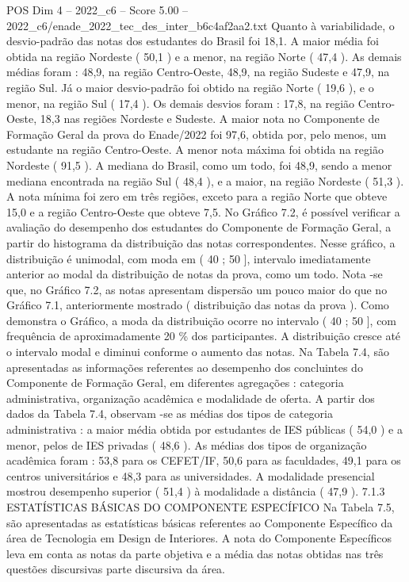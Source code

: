 \begin{textsample}{POS Dim 4 – 2022\_c6 – Score 5.00 – 2022\_c6/enade\_2022\_tec\_des\_inter\_b6c4af2aa2.txt}
Quanto à variabilidade, o desvio-padrão das notas dos estudantes do Brasil foi 18,1.
A maior média foi obtida na região Nordeste ( 50,1 ) e a menor, na região Norte ( 47,4 ).
As demais médias foram : 48,9, na região Centro-Oeste, 48,9, na região Sudeste e 47,9, na região Sul.
Já o maior desvio-padrão foi obtido na região Norte ( 19,6 ), e o menor, na região Sul ( 17,4 ).
Os demais desvios foram : 17,8, na região Centro-Oeste, 18,3 nas regiões Nordeste e Sudeste.
A maior nota no Componente de Formação Geral da prova do Enade/2022 foi 97,6, obtida por, pelo menos, um estudante na região Centro-Oeste.
A menor nota máxima foi obtida na região Nordeste ( 91,5 ).
A mediana do Brasil, como um todo, foi 48,9, sendo a menor mediana encontrada na região Sul ( 48,4 ), e a maior, na região Nordeste ( 51,3 ).
A nota mínima foi zero em três regiões, exceto para a região Norte que obteve 15,0 e a região Centro-Oeste que obteve 7,5.
No Gráfico 7.2, é possível verificar a avaliação do desempenho dos estudantes do Componente de Formação Geral, a partir do histograma da distribuição das notas correspondentes.
Nesse gráfico, a distribuição é unimodal, com moda em ( 40 ; 50 ], intervalo imediatamente anterior ao modal da distribuição de notas da prova, como um todo.
Nota -se que, no Gráfico 7.2, as notas apresentam dispersão um pouco maior do que no Gráfico 7.1, anteriormente mostrado ( distribuição das notas da prova ).
Como demonstra o Gráfico, a moda da distribuição ocorre no intervalo ( 40 ; 50 ], com frequência de aproximadamente 20 \% dos participantes.
A distribuição cresce até o intervalo modal e diminui conforme o aumento das notas.
Na Tabela 7.4, são apresentadas as informações referentes ao desempenho dos concluintes do Componente de Formação Geral, em diferentes agregações : categoria administrativa, organização acadêmica e modalidade de oferta.
A partir dos dados da Tabela 7.4, observam -se as médias dos tipos de categoria administrativa : a maior média obtida por estudantes de IES públicas ( 54,0 ) e a menor, pelos de IES privadas ( 48,6 ).
As médias dos tipos de organização acadêmica foram : 53,8 para os CEFET/IF, 50,6 para as faculdades, 49,1 para os centros universitários e 48,3 para as universidades.
A modalidade presencial mostrou desempenho superior ( 51,4 ) à modalidade a distância ( 47,9 ). 7.1.3 ESTATÍSTICAS BÁSICAS DO COMPONENTE ESPECÍFICO Na Tabela 7.5, são apresentadas as estatísticas básicas referentes ao Componente Específico da área de Tecnologia em Design de Interiores.
A nota do Componente Específicos leva em conta as notas da parte objetiva e a média das notas obtidas nas três questões discursivas parte discursiva da área.

\end{textsample}
